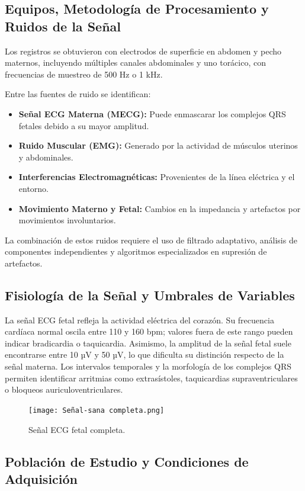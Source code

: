 \documentclass[10pt, conference]{IEEEtran}
\begin{document}
\subsection{Equipos, Metodología de Procesamiento y Ruidos de la Señal}

Los registros se obtuvieron con electrodos de superficie en abdomen y pecho maternos, incluyendo múltiples canales abdominales y uno torácico, con frecuencias de muestreo de 500 Hz o 1 kHz.

Entre las fuentes de ruido se identifican:
\begin{itemize}
	\item \textbf{Señal ECG Materna (MECG):} Puede enmascarar los complejos QRS fetales debido a su mayor amplitud.
	\item \textbf{Ruido Muscular (EMG):} Generado por la actividad de músculos uterinos y abdominales.
	\item \textbf{Interferencias Electromagnéticas:} Provenientes de la línea eléctrica y el entorno.
	\item \textbf{Movimiento Materno y Fetal:} Cambios en la impedancia y artefactos por movimientos involuntarios.
\end{itemize}

La combinación de estos ruidos requiere el uso de filtrado adaptativo, análisis de componentes independientes y algoritmos especializados en supresión de artefactos.

\subsection{Fisiología de la Señal y Umbrales de Variables}

La señal ECG fetal refleja la actividad eléctrica del corazón. Su frecuencia cardíaca normal oscila entre 110 y 160 bpm; valores fuera de este rango pueden indicar bradicardia o taquicardia. Asimismo, la amplitud de la señal fetal suele encontrarse entre 10 µV y 50 µV, lo que dificulta su distinción respecto de la señal materna. Los intervalos temporales y la morfología de los complejos QRS permiten identificar arritmias como extrasístoles, taquicardias supraventriculares o bloqueos auriculoventriculares.

\begin{figure}[htbp]
	\centerline{\texttt{[image: Señal-sana completa.png]}}
	\caption{Señal ECG fetal completa.}
	\label{fig:complete_signal}
\end{figure}

\subsection{Población de Estudio y Condiciones de Adquisición}
\end{document}
